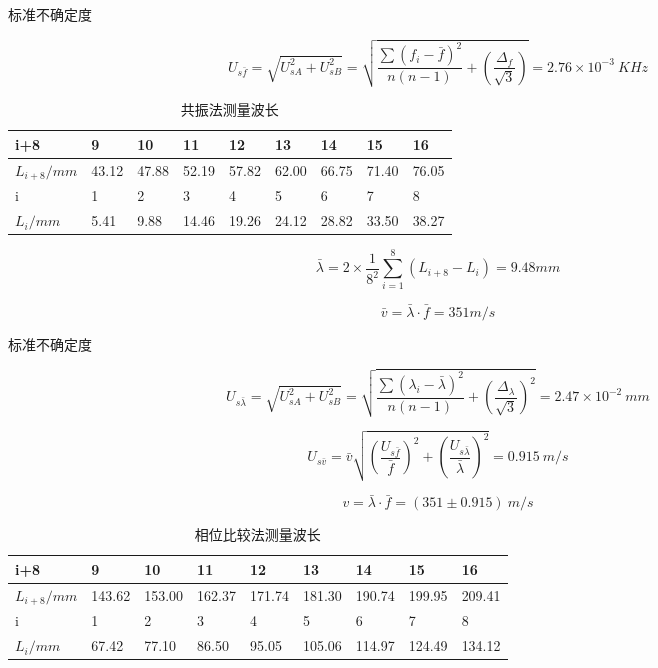 \documentclass[12pt,a4paper,oneside,UTF8]{ctexart}
\begin{document}
\noindent 标准不确定度

$$ U_{s\bar f} = \sqrt{U_{sA}^2 + U_{sB}^2} = \sqrt{\dfrac{\sum (f_i - \bar f)^2}{n(n-1)} + (\dfrac{\Delta_f}{\sqrt{3}})} = 2.76 \times 10^{-3} ~ KHz$$

\begin{table}[h]
	\caption{共振法测量波长}
	\label{lambda1}
	\centering
	\begin{tabular}{p{1.5cm}<{\centering}|p{1.2cm}<{\centering}|p{1.2cm}<{\centering}|m{1.2cm}<{\centering}|p{1.2cm}<{\centering}|p{1.2cm}<{\centering}|p{1.2cm}<{\centering}|p{1.2cm}<{\centering}|p{1.2cm}<{\centering}}
		i+8&9&10&11&12&13&14&15&16 \\ \hline
		$L_{i+8}/mm$&43.12&47.88&52.19&57.82&62.00&66.75&71.40&76.05 \\ \hline
		i&1&2&3&4&5&6&7&8 \\ \hline
		$L_{i}/mm$&5.41&9.88&14.46&19.26&24.12&28.82&33.50&38.27\\ 
	
	\end{tabular}

\end{table}

$$ \bar \lambda = 2 \times \dfrac{1}{8^2} \sum_{i=1}^{8}(L_{i+8} - L_i) = 9.48 mm $$

$$ \bar v = \bar \lambda \cdot \bar f  = 351 m/s $$ 

\noindent 标准不确定度

$$ U_{s\bar \lambda} = \sqrt{U_{sA}^2 + U_{sB}^2} = \sqrt{\dfrac{\sum (\lambda_i - \bar \lambda)^2}{n(n-1)} + (\dfrac{\Delta_{\lambda}}{\sqrt{3}})^2} = 2.47 \times 10^{-2} ~ mm$$

 
$$ U_{s\bar v} = \bar v \sqrt{(\dfrac{U_{s\bar f}}{\bar f})^2 + (\dfrac{U_{s \bar \lambda}}{\bar \lambda})^2} = 0.915 ~ m/s $$

$$ v = \bar \lambda \cdot \bar f  = (351 \pm 0.915) ~ m/s $$ 

\begin{table}[h]
	\caption{相位比较法测量波长}
	\label{lambda2}
	\centering
	\begin{tabular}{p{1.5cm}<{\centering}|p{1.2cm}<{\centering}|p{1.2cm}<{\centering}|m{1.2cm}<{\centering}|p{1.2cm}<{\centering}|p{1.2cm}<{\centering}|p{1.2cm}<{\centering}|p{1.2cm}<{\centering}|p{1.2cm}<{\centering}}
		i+8&9&10&11&12&13&14&15&16 \\ \hline
		$L_{i+8}/mm$&143.62&153.00&162.37&171.74&181.30&190.74&199.95&209.41 \\ \hline
		i&1&2&3&4&5&6&7&8 \\ \hline
		$L_{i}/mm$&67.42&77.10&86.50&95.05&105.06&114.97&124.49&134.12\\ 
	
	\end{tabular}

\end{table}
\end{document}
